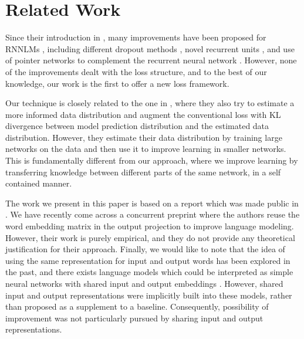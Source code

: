 \section{Related Work}
Since their introduction in \citet{mikolov2010recurrent}, many improvements have been proposed for RNNLMs , including different dropout methods \citep{zaremba2014recurrent,gal2015theoretically}, novel recurrent units \citep{zilly2016recurrent}, and use of pointer networks to complement the recurrent neural network \citep{merity2016pointer}.
However, none of the improvements dealt with the loss structure, and to the best of our knowledge, our work is the first to offer a new loss framework.

Our technique is closely related to the one in \citet{hinton2015distilling}, where they also try to estimate a more informed data distribution and augment the conventional loss with KL divergence between model prediction distribution and the estimated data distribution. However, they estimate their data distribution by training large networks on the data and then use it to improve learning in smaller networks. This is fundamentally different from our approach, where we improve learning by transferring knowledge between different parts of the same network, in a self contained manner.

The work we present in this paper is based on a report which was made public in \citet{inanimproved}.
We have recently come across a concurrent preprint \citep{press2016using} where the authors reuse the word embedding matrix in the output projection to improve language modeling.
However, their work is purely empirical, and they do not provide any theoretical justification for their approach.
Finally, we would like to note that the idea of using the same representation for input and output words has been explored in the past, and there exists language models which could be interpreted as simple neural networks with shared input and output embeddings \citep{nnlm:2001:nips,mnih2007three}.
However, shared input and output representations were implicitly built into these models, rather than proposed as a supplement to a baseline.
Consequently, possibility of improvement was not particularly pursued by sharing input and output representations.


